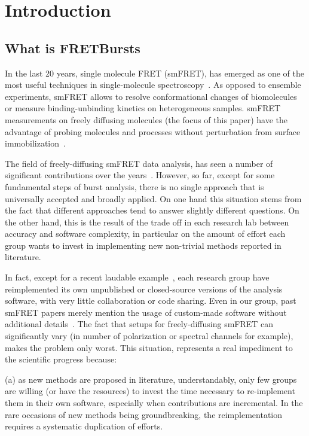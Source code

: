 \section{Introduction}

\subsection{What is FRETBursts}

In the last 20 years, single molecule FRET (smFRET), has emerged as one of the most
useful techniques in single-molecule spectroscopy~\cite{Weiss_1999,Hohlbein_2014}. 
As opposed to ensemble experiments, smFRET allows to resolve conformational 
changes of biomolecules or measure binding-unbinding kinetics on heterogeneous samples. 
smFRET measurements on freely diffusing molecules (the focus of this paper) have the advantage 
of probing molecules and processes without perturbation from surface immobilization~\cite{Dahan_1999,Eggeling_1998}. 

The field of freely-diffusing smFRET data analysis, has seen a number of significant 
contributions over the 
years~\cite{Fries_1998,Eggeling_2001,Zhang_2005,Gopich_2005,Lee_2005,Nir_2006,Antonik2006,Gopich_2007,Gopich_2008,Camley_2009,Santoso_2010,Torella_2011,Tomov_2012}. 
However, so far, except for some fundamental steps of burst analysis, 
there is no single approach that is universally accepted and broadly applied. 
On one hand this situation stems from the fact that
different approaches tend to answer slightly different questions.
On the other hand, this is the result of the trade off in each research lab
between accuracy and software complexity, in particular on the amount of effort
each group wants to invest in implementing new non-trivial methods reported in literature.

In fact, except for a recent laudable example~\cite{Murphy2014}, 
each research group have reimplemented its own unpublished or closed-source versions
of the analysis software, with very little collaboration or code sharing.
Even in our group, past smFRET papers merely mention the usage of custom-made software without 
additional details~\cite{Lee_2005,Nir_2006}.
The fact that setups for freely-diffusing smFRET can significantly 
vary (in number of polarization or spectral channels for example), 
makes the problem only worst.
This situation, represents a real impediment to the scientific progress because:

(a) as new methods are proposed in literature, understandably, only few 
groups are willing (or have the resources) to invest the time necessary to 
re-implement them in their own software, especially when contributions are incremental. 
In the rare occasions of new methods being groundbreaking, the reimplementation 
requires a systematic duplication of efforts. 

